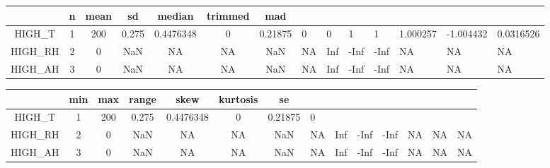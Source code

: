 
\begin{tabular}{|c|c|c|c|c|c|c|}
\hline
   & n & mean & sd & median & trimmed & mad\\
\hline
HIGH\_T & 1 & 200 & 0.275 & 0.4476348 & 0 & 0.21875 & 0 & 0 & 1 & 1 & 1.000257 & -1.004432 & 0.0316526\\
\hline
HIGH\_RH & 2 & 0 & NaN & NA & NA & NaN & NA & Inf & -Inf & -Inf & NA & NA & NA\\
\hline
HIGH\_AH & 3 & 0 & NaN & NA & NA & NaN & NA & Inf & -Inf & -Inf & NA & NA & NA\\
\hline
\end{tabular}

\begin{tabular}{|c|c|c|c|c|c|c|}
  \hline
     & min & max & range & skew & kurtosis & se\\
  \hline
  HIGH\_T & 1 & 200 & 0.275 & 0.4476348 & 0 & 0.21875 & 0\\
  \hline
  HIGH\_RH & 2 & 0 & NaN & NA & NA & NaN & NA & Inf & -Inf & -Inf & NA & NA & NA\\
  \hline
  HIGH\_AH & 3 & 0 & NaN & NA & NA & NaN & NA & Inf & -Inf & -Inf & NA & NA & NA\\
  \hline
  \end{tabular}
  
